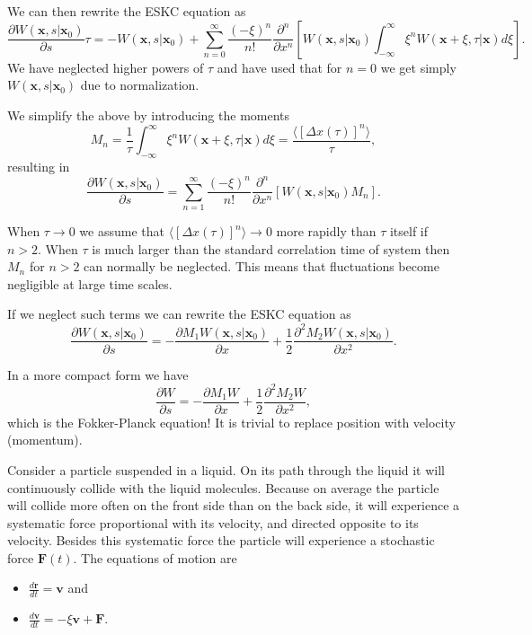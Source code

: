 \documentclass[%
oneside,                 %
final,                   %
10pt]{article}
\begin{document}
We can then rewrite the ESKC equation as 
\[
\frac{\partial W(\mathbf{x},s|\mathbf{x}_0)}{\partial s}\tau=-W(\mathbf{x},s|\mathbf{x}_0)+
\sum_{n=0}^{\infty}\frac{(-\xi)^n}{n!}\frac{\partial^n}{\partial x^n}
\left[W(\mathbf{x},s|\mathbf{x}_0)\int_{-\infty}^{\infty} \xi^nW(\mathbf{x}+\xi,\tau|\mathbf{x})d\xi\right].
\]
We have neglected higher powers of $\tau$ and have used that for $n=0$ 
we get simply $W(\mathbf{x},s|\mathbf{x}_0)$ due to normalization.

We simplify the above by introducing the moments 
\[
M_n=\frac{1}{\tau}\int_{-\infty}^{\infty} \xi^nW(\mathbf{x}+\xi,\tau|\mathbf{x})d\xi=
\frac{\langle [\Delta x(\tau)]^n\rangle}{\tau},
\]
resulting in
\[
\frac{\partial W(\mathbf{x},s|\mathbf{x}_0)}{\partial s}=
\sum_{n=1}^{\infty}\frac{(-\xi)^n}{n!}\frac{\partial^n}{\partial x^n}
\left[W(\mathbf{x},s|\mathbf{x}_0)M_n\right].
\]

When $\tau \rightarrow 0$ we assume that $\langle [\Delta x(\tau)]^n\rangle \rightarrow 0$ more rapidly than $\tau$ itself if $n > 2$. 
When $\tau$ is much larger than the standard correlation time of 
system then $M_n$ for $n > 2$ can normally be neglected.
This means that fluctuations become negligible at large time scales.

If we neglect such terms we can rewrite the ESKC equation as 
\[
\frac{\partial W(\mathbf{x},s|\mathbf{x}_0)}{\partial s}=
-\frac{\partial M_1W(\mathbf{x},s|\mathbf{x}_0)}{\partial x}+
\frac{1}{2}\frac{\partial^2 M_2W(\mathbf{x},s|\mathbf{x}_0)}{\partial x^2}.
\]

In a more compact form we have
\[
\frac{\partial W}{\partial s}=
-\frac{\partial M_1W}{\partial x}+
\frac{1}{2}\frac{\partial^2 M_2W}{\partial x^2},
\]
which is the Fokker-Planck equation!  It is trivial to replace 
position with velocity (momentum).

Consider a particle  suspended in a liquid. On its path through the liquid it will continuously collide with the liquid molecules. Because on average the particle  will collide more often on the front side than on the back side, it will experience a systematic force proportional with its velocity, and directed opposite to its velocity. Besides this systematic force the particle  will experience a stochastic force  $\mathbf{F}(t)$. 
The equations of motion are 
\begin{itemize}
\item $\frac{d\mathbf{r}}{dt}=\mathbf{v}$ and 

\item $\frac{d\mathbf{v}}{dt}=-\xi \mathbf{v}+\mathbf{F}$.
\end{itemize}
\end{document}

